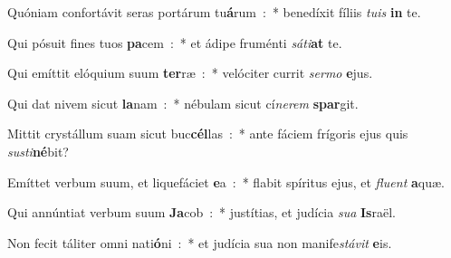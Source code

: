﻿\item Quóniam confortávit seras portárum tu\textbf{á}rum~:~* benedíxit fíliis \emph{tu}\emph{is} \textbf{in} te.
\item Qui pósuit fines tuos \textbf{pa}cem~:~* et ádipe fruménti \emph{sá}\emph{ti}\textbf{at} te.
\item Qui emíttit elóquium suum \textbf{ter}ræ~:~* velóciter currit \emph{ser}\emph{mo} \textbf{e}jus.
\item Qui dat nivem sicut \textbf{la}nam~:~* nébulam sicut cí\emph{ne}\emph{rem} \textbf{spar}git.
\item Mittit crystállum suam sicut buc\textbf{cél}las~:~* ante fáciem frígoris ejus quis \emph{sus}\emph{ti}\textbf{né}bit?
\item Emíttet verbum suum, et liquefáciet \textbf{e}a~:~* flabit spíritus ejus, et \emph{flu}\emph{ent} \textbf{a}quæ.
\item Qui annúntiat verbum suum \textbf{Ja}cob~:~* justítias, et judícia \emph{su}\emph{a} \textbf{Is}raël.
\item Non fecit táliter omni nati\textbf{ó}ni~:~* et judícia sua non ma\-ni\-fe\-\emph{stá}\-\emph{vit} \textbf{e}is.